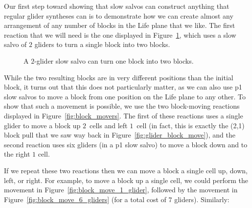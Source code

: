 Our first step toward showing that slow salvos can construct anything that regular glider syntheses can is to demonstrate how we can create almost any arrangement of any number of blocks in the Life plane that we like. The first reaction that we will need is the one displayed in Figure~\ref{fig:slow_salvo_splitter}, which uses a slow salvo of $2$ gliders to turn a single block into two blocks.

\begin{figure}[!htb]
	\centering{}
	\caption{A $2$-glider slow salvo can turn one block into two blocks.}\label{fig:slow_salvo_splitter}
\end{figure}

While the two resulting blocks are in very different positions than the initial block, it turns out that this does not particularly matter, as we can also use p1 slow salvos to move a block from one position on the Life plane to any other. To show that such a movement is possible, we use the two block-moving reactions displayed in Figure~\ref{fig:block_movers}. The first of these reactions uses a single glider to move a block up $2$~cells and left $1$~cell (in fact, this is exactly the (2,1) block pull that we saw way back in Figure~\ref{fig:glider_block_move}), and the second reaction uses six gliders (in a p1 slow salvo) to move a block down and to the right $1$ cell.

If we repeat these two reactions then we can move a block a single cell up, down, left, or right. For example, to move a block up a single cell, we could perform the movement in Figure~\ref{fig:block_move_1_glider}, followed by the movement in Figure~\ref{fig:block_move_6_gliders} (for a total cost of $7$ gliders). Similarly:\smallskip

